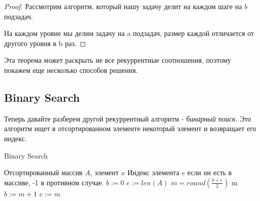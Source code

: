 \documentclass[../book.tex]{subfiles}
\begin{document}
	\begin{proof}
	 	Рассмотрим алгоритм, который нашу задачу делит на каждом шаге на $b$ подзадач.
	 	\begin{center}
	 	\end{center}
	 	На каждом уровне мы делим задачу на a подзадач, размер каждой отличается от другого уровня в b раз.  
	 	\begin{comment}
	 			на i уровне, n/b^i -- размер подзадачи
	 				всего на каждом уровне a^i подзадач.
	 				на каждом уровне a_i * (n/b^i)^d * c
	 				отсюда основная теорема.
	 	\end{comment}
	\end{proof}
		Эта теорема может раскрыть не все рекуррентные соотношения, поэтому покажем еще несколько способов решения.
	
	\subsection{Binary Search}
	
	Теперь давайте разберем другой рекуррентный алгоритм - \textit{бинарный поиск}. Это алгоритм ищет в отсортированном элементе некоторый элемент и возвращает его индекс.
		
	\begin{algorithm}[H]
		\caption{Binary Search}
		\begin{algorithmic}[1]
			\Require Отсортированный массив $A$, элемент $x$
			\Ensure Индекс элемента $e$ если он есть в массиве, -1 в противном случае.
				\State $b := 0$
				\State $e := len(A)$
					\State $m = round(\frac{b + e}{2})$
						\State \Return m
						\State $b := m + 1$
					\Else
						\State $e := m$
					\EndIf
				\EndWhile
				\State {}
			\EndFunction
		\end{algorithmic}
	\end{algorithm}
	
\end{document}
